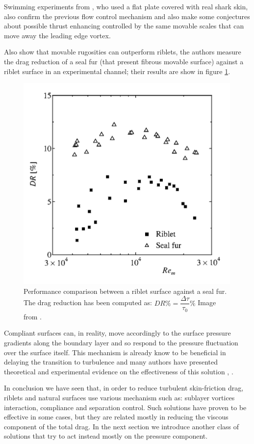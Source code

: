 Swimming experiments from \citet{Oeffner785}, who used a flat plate covered with real shark skin, also confirm the previous flow control mechanism and also make some conjectures about possible thrust enhancing controlled by the same movable scales that can move away the leading edge vortex.

Also \citet{itoh2006turbulent} show that movable rugosities can outperform riblets, the authors measure the drag reduction of a seal fur (that present fibrous movable surface) against a riblet surface in an experimental channel; their results are show in figure \ref{fig:seal}.

\begin{figure}[h]
\centering
\includegraphics[width=0.5\linewidth]{chapter_1/seal}
\caption{Performance comparison between a riblet surface against a seal fur. The drag reduction has been computed as: $DR \% = \dfrac{ \Delta \tau}{\tau_{0}} \%$ Image from \citet{itoh2006turbulent}.}
\label{fig:seal}
\end{figure}


Compliant surfaces can, in reality, move accordingly to the surface pressure gradients along the boundary layer and so respond to the pressure fluctuation over the surface itself.
This mechanism is already know to be beneficial in delaying the transition to turbulence and many authors have presented theoretical and experimental evidence on the effectiveness of this solution \citet{carpenter1990status}, \citet{bushnell1977effect}.

In conclusion we have seen that, in order to reduce turbulent skin-friction drag, riblets and natural surfaces use various mechanism such as: sublayer vortices interaction, compliance and separation control.
Such solutions have proven to be effective in some cases, but they are related mostly in reducing the viscous component of the total drag.
In the next section we introduce another class of solutions that try to act instead mostly on the pressure component.



